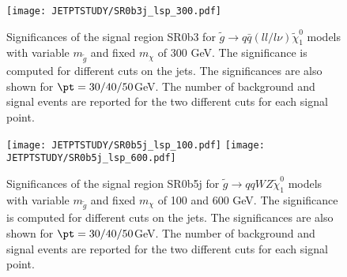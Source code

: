 \begin{figure}[!ht]
  \centering
  \texttt{[image: JETPTSTUDY/SR0b3j\_lsp\_300.pdf]}
  \caption{Significances of the signal region SR0b3 for $\tilde{g} \rightarrow q\bar{q}(ll/l\nu)\tilde{\chi}_{1}^{0}$ models with variable $m_{\tilde{g}}$ and fixed $m_{\chi}$ of 300 GeV. The significance is computed for different \pt cuts on the jets. The significances are also shown for $\pt = 30 / 40 / 50 $GeV. The number of background and signal events are reported for the two different cuts for each signal point.}
  \label{fig:Pt_jet_SR0b3j}
\end{figure}

\begin{figure}[!ht]
  \centering
  \texttt{[image: JETPTSTUDY/SR0b5j\_lsp\_100.pdf]}
   \texttt{[image: JETPTSTUDY/SR0b5j\_lsp\_600.pdf]}
  \caption{Significances of the signal region SR0b5j for $\tilde{g} \rightarrow qqWZ\tilde{\chi}_{1}^{0}$ models with variable $m_{\tilde{g}}$ and fixed $m_{\chi}$ of 100 and 600 GeV. The significance is computed for different \pt cuts on the jets. The significances are also shown for $\pt = 30 / 40 / 50 $GeV. The number of background and signal events are reported for the two different cuts for each signal point.}
  \label{fig:Pt_jet_SR0b5j}
\end{figure}
 

\FloatBarrier